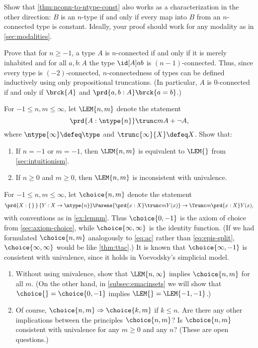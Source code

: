 \begin{ex}\label{ex:ntype-from-nconn-const}
  Show that \cref{thm:nconn-to-ntype-const} also works as a characterization in the other direction: $B$ is an $n$-type if and only if every map into $B$ from an $n$-con\-nect\-ed type is constant.
  Ideally, your proof should work for any modality as in \cref{sec:modalities}.
\end{ex}

\begin{ex}\label{ex:connectivity-inductively}
  Prove that for $n\ge -1$, a type $A$ is $n$-connected if and only if it is merely inhabited and for all $a,b:A$ the type $\id[A]ab$ is $(n-1)$-connected.
  Thus, since every type is $(-2)$-connected, $n$-connectedness of types can be defined inductively using only propositional truncations.
  (In particular, $A$ is 0-connected if and only if $\brck{A}$ and $\prd{a,b:A} \brck{a=b}$.)
\end{ex}

\begin{ex}\label{ex:lemnm}
  For $-1\le n,m \le\infty$, let $\LEM{n,m}$ denote the statement
  \[ \prd{A:\ntype{n}} \trunc m{A + \neg A},\]
  where $\ntype{\infty} \defeq \type$ and $\trunc{\infty}{X}\defeq X$.
  Show that:
  \begin{enumerate}
  \item If $n=-1$ or $m=-1$, then $\LEM{n,m}$ is equivalent to $\LEM{}$ from \cref{sec:intuitionism}.
  \item If $n\ge 0$ and $m\ge 0$, then $\LEM{n,m}$ is inconsistent with univalence.
  \end{enumerate}
\end{ex}

\begin{ex}\label{ex:acnm}
  For $-1\le n,m\le\infty$, let $\choice{n,m}$ denote the statement
  \[ \prd{X:\set}{Y:X\to\ntype{n}}
  \Parens{\prd{x:X} \trunc m{Y(x)}}
  \to
  \Trunc m{\prd{x:X} Y(x)},
  \]
  with conventions as in \cref{ex:lemnm}.
  Thus $\choice{0,-1}$ is the axiom of choice from \cref{sec:axiom-choice},
  while $\choice{\infty,\infty}$ is the identity function.
  (If we had formulated $\choice{n,m}$ analogously to \eqref{eq:ac}
  rather than \eqref{eq:epis-split},
  $\choice{\infty,\infty}$ would be like \cref{thm:ttac}.)
  It is known that $\choice{\infty,-1}$ is consistent with univalence, since it holds in Voevodsky's simplicial model.
  \begin{enumerate}
  \item Without using univalence, show that $\LEM{n,\infty}$ implies $\choice{n,m}$ for all $m$.
    (On the other hand, in \cref{subsec:emacinsets} we will show that $\choice{}=\choice{0,-1}$ implies $\LEM{}=\LEM{-1,-1}$.)
  \item Of course, $\choice{n,m}\Rightarrow \choice{k,m}$ if $k\le n$.
    Are there any other implications between the principles $\choice{n,m}$?
    Is $\choice{n,m}$ consistent with univalence for any $m\ge 0$ and any $n$?
    (These are open questions.)
  \end{enumerate}
\end{ex}

